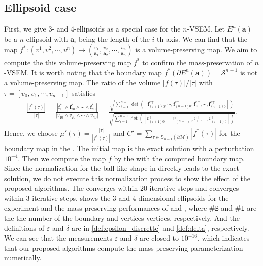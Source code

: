 \documentclass{article}
\begin{document}
\subsection{Ellipsoid case}
First, we give $3$- and $4$-ellipsoids as a special case for the $n$-VSEM. Let $E^n(\mathbf{a})$ be a $n$-ellipsoid with $\mathbf{a}_i$ being the length of the $i$-th axis. We can find that the map $f^*:(v^1,v^2,\cdots,v^n) \to \left( \frac{v_1}{\mathbf{a}_1}, \frac{v_2}{\mathbf{a}_2}, \cdots, \frac{v_n}{\mathbf{a}_n} \right)$ is a volume-preserving map. We aim to compute the this volume-preserving map $f^*$ to confirm the mass-preservation of $n$-VSEM. It is worth noting that the boundary map $f^*(\partial E^n(\mathbf{a})) = \mathcal{S}^{n-1}$ is not a volume-preserving map. The ratio of the volume $|f(\tau)|/|\tau|$ with $\tau = [v_0,v_1,\cdots,v_{n-1}]$ satisfies
\begin{align}
    \frac{|f^*(\tau)|}{|\tau|} = \frac{|\mathbf{f}_{10}^* \wedge \mathbf{f}_{20}^* \wedge \cdots \wedge \mathbf{f}_{n0}^*|}{|v_{10} \wedge v_{20} \wedge \cdots \wedge v_{n0}|} = \frac{\sqrt{\sum_{i = 1}^{n-1} \det([ \mathbf{f}_{(i+1)0}^{*\top}, \cdots, \mathbf{f}_{(n-1)0}^{*\top}, \mathbf{f}_{10}^{*\top}, \cdots, \mathbf{f}_{(i-1)0}^{*\top} ])}}{\sqrt{\sum_{i = 1}^{n-1} \det([ v_{(i+1)0}^\top, \cdots, v_{(n-1)0}^\top, v_{10}^\top, \cdots, v_{(i-1)0}^\top ])}}.
\end{align}
Hence, we choose $\mu'(\tau) = \frac{|\tau|}{|f^*(\tau)|}$ and $C' = \sum_{\tau \in \mathbb{S}_{n-1}(\partial \mathcal{M})} |f^*(\tau)|$ for the boundary map in the . The initial map is the exact solution with a perturbation $10^{-4}$. Then we compute the map $f$ by the  with the computed boundary map. Since the normalization for the ball-like shape in  directly leads to the exact solution, we do not execute this normalization process to show the effect of the proposed algorithms.
The  converges within $20$ iterative steps and  converges  within $3$ iterative steps.
 shows the $3$ and $4$ dimensional ellipsoids for the experiment and the mass-preserving performances of  and , where $\# \mathtt{B}$ and $\# \mathtt{I}$ are the the number of the boundary and vertices vertices, respectively. And the definitions of $\varepsilon$ and $\delta$ are in \eqref{def:epsilon_discrette} and \eqref{def:delta}, respectively. We can see that the measurements $\varepsilon$ and $\delta$ are closed to $10^{-16}$, which indicates that our proposed algorithms compute the mass-preserving parameterization numerically.
\end{document}
